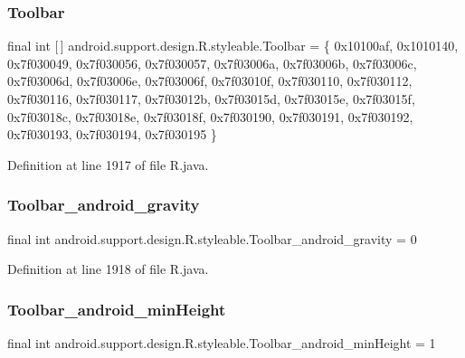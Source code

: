 \subsubsection{\texorpdfstring{Toolbar}{Toolbar}}
{\footnotesize\ttfamily final int \mbox{[}$\,$\mbox{]} android.\+support.\+design.\+R.\+styleable.\+Toolbar = \{ 0x10100af, 0x1010140, 0x7f030049, 0x7f030056, 0x7f030057, 0x7f03006a, 0x7f03006b, 0x7f03006c, 0x7f03006d, 0x7f03006e, 0x7f03006f, 0x7f03010f, 0x7f030110, 0x7f030112, 0x7f030116, 0x7f030117, 0x7f03012b, 0x7f03015d, 0x7f03015e, 0x7f03015f, 0x7f03018c, 0x7f03018e, 0x7f03018f, 0x7f030190, 0x7f030191, 0x7f030192, 0x7f030193, 0x7f030194, 0x7f030195 \}\hspace{0.3cm}{\ttfamily [static]}}



Definition at line 1917 of file R.\+java.

\mbox{\label{classandroid_1_1support_1_1design_1_1_r_1_1styleable_ae9f189e116f70336a287fd07ccbad870}} 
\subsubsection{\texorpdfstring{Toolbar\_android\_gravity}{Toolbar\_android\_gravity}}
{\footnotesize\ttfamily final int android.\+support.\+design.\+R.\+styleable.\+Toolbar\+\_\+android\+\_\+gravity = 0\hspace{0.3cm}{\ttfamily [static]}}



Definition at line 1918 of file R.\+java.

\mbox{\label{classandroid_1_1support_1_1design_1_1_r_1_1styleable_a577363bd15a566f94f5c7a9f24cf1ab5}} 
\subsubsection{\texorpdfstring{Toolbar\_android\_minHeight}{Toolbar\_android\_minHeight}}
{\footnotesize\ttfamily final int android.\+support.\+design.\+R.\+styleable.\+Toolbar\+\_\+android\+\_\+min\+Height = 1\hspace{0.3cm}{\ttfamily [static]}}



